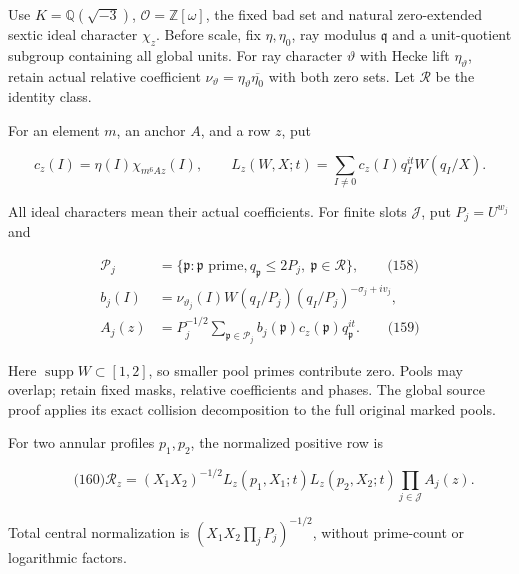 Use \(K=\mathbb Q(\sqrt{-3})\), \(\mathcal O=\mathbb Z[\omega]\), the fixed bad set and natural zero-extended sextic ideal character \(\chi_z\). Before scale, fix \(\eta,\eta_0\), ray modulus \(\mathfrak q\) and a unit-quotient subgroup containing all global units. For ray character \(\vartheta\) with Hecke lift \(\eta_\vartheta\), retain actual relative coefficient \(\nu_\vartheta=\eta_\vartheta\overline{\eta_0}\) with both zero sets. Let \(\mathcal R\) be the identity class.

For an element \(m\), an anchor \(A\), and a row \(z\), put

\[
c_z(I)=\eta(I)\chi_{m^6Az}(I),\qquad
 L_z(W,X;t)=\sum_{I\ne0}c_z(I)q_I^{it}W(q_I/X).
\]

All ideal characters mean their actual coefficients. For finite slots \(\mathcal J\), put \(P_j=U^{w_j}\) and

\hypertarget{ma:pools}{}

\label{ma:pools} \hypertarget{ma:slot}{}\label{ma:slot}

\[
\begin{aligned}
 \mathcal P_j&=\{\mathfrak p:\mathfrak p\text{ prime},
                    q_{\mathfrak p}\le2P_j,\ \mathfrak p\in\mathcal R\},
                                                        \qquad\text{(158)}\\
 b_j(I)&=\nu_{\vartheta_j}(I)
 W(q_I/P_j)(q_I/P_j)^{-\sigma_j+iv_j},\\
 A_j(z)&=P_j^{-1/2}\sum_{\mathfrak p\in\mathcal P_j}
                  b_j(\mathfrak p)c_z(\mathfrak p)q_{\mathfrak p}^{it}.
                                                        \qquad\text{(159)}
\end{aligned}
\]

Here \(\operatorname{supp}W\subset[1,2]\), so smaller pool primes contribute zero. Pools may overlap; retain fixed masks, relative coefficients and phases. The global source proof applies its exact collision decomposition to the full original marked pools.

For two annular profiles \(p_1,p_2\), the normalized positive row is

\hypertarget{ma:positive-row}{}

\label{ma:positive-row}

\[
\qquad\text{(160)}
 \mathscr R_z=(X_1X_2)^{-1/2}
       L_z(p_1,X_1;t)L_z(p_2,X_2;t)\prod_{j\in\mathcal J}A_j(z).
\]

Total central normalization is \((X_1X_2\prod_jP_j)^{-1/2}\), without prime-count or logarithmic factors.

